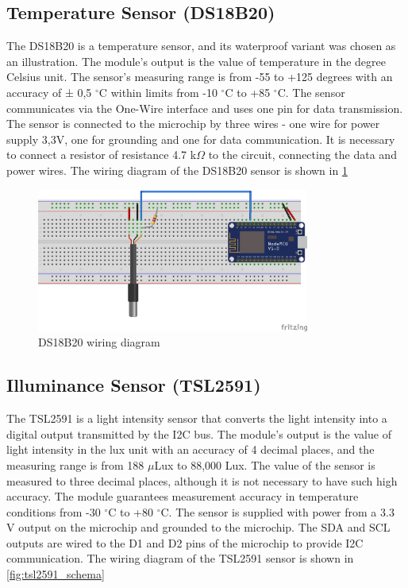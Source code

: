 \subsection{Temperature Sensor (DS18B20)}

The DS18B20 \citep{DS18B20_Datasheet} is a temperature sensor, and its waterproof variant was chosen as an illustration.  The module's output is the value of temperature in the degree Celsius unit. The sensor's measuring range is from -55 to +125 degrees with an accuracy of ± 0,5 $^{\circ}$C within limits from -10 $^{\circ}$C to +85 $^{\circ}$C. The sensor communicates via the One-Wire interface and uses one pin for data transmission. The sensor is connected to the microchip by three wires - one wire for power supply 3,3V, one for grounding and one for data communication. It is necessary to connect a resistor of resistance 4.7 k$\Omega$ to the circuit, connecting the data and power wires. The wiring diagram of the DS18B20 sensor is shown in \cref{fig:ds18b20_schema}

\begin{figure}[H]
	\centering
	\includegraphics[width=0.8\textwidth]{img/ds18b20_schema.png}
	\caption{DS18B20 wiring diagram}
	\label{fig:ds18b20_schema}
\end{figure}

\subsection{Illuminance Sensor (TSL2591)}

The TSL2591 \citep{TSL2591_Datasheet} is a light intensity sensor that converts the light intensity into a digital output transmitted by the I2C bus. The module's output is the value of light intensity in the lux unit with an accuracy of 4 decimal places, and the measuring range is from 188 $\mu$Lux to 88,000 Lux. The value of the sensor is measured to three decimal places, although it is not necessary to have such high accuracy. The module guarantees measurement accuracy in temperature conditions from -30 $^{\circ}$C to +80 $^{\circ}$C. The sensor is supplied with power from a 3.3 V output on the microchip and grounded to the microchip. The SDA and SCL outputs are wired to the D1 and D2 pins of the microchip to provide I2C communication. The wiring diagram of the TSL2591 sensor is shown in \cref{fig:tsl2591_schema}

